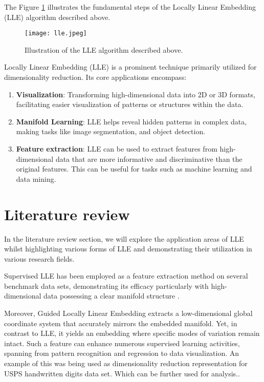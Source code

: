 The Figure \ref{fig:image} illustrates the fundamental steps of the Locally Linear Embedding (LLE) algorithm described above.

\begin{figure}[h]
    \centering
    \texttt{[image: lle.jpeg]}
    \caption{Illustration of the LLE algorithm described above.}
    \label{fig:image}
\end{figure}


Locally Linear Embedding (LLE) is a prominent technique primarily utilized for dimensionality reduction. Its core applications encompass:

\begin{enumerate}
    \item \textbf{Visualization}: Transforming high-dimensional data into 2D or 3D formats, facilitating easier visualization of patterns or structures within the data.
    
    \item \textbf{Manifold Learning}: LLE helps reveal hidden patterns in complex data, making tasks like image segmentation, and object detection.

    \item \textbf{Feature extraction}: LLE can be used to extract features from high-dimensional data that are more informative and discriminative than the original features. This can be useful for tasks such as machine learning and data mining. 

\end{enumerate}


\section{Literature review}



In the literature review section, we will explore the application areas of LLE whilst highlighting various forms of LLE and demonstrating their utilization in various research fields.

Supervised LLE has been employed as a feature extraction method on several benchmark data sets, demonstrating its efficacy particularly with high-dimensional data possessing a clear manifold structure \cite{de2003supervised}.

Moreover, Guided Locally Linear Embedding extracts a low-dimensional global coordinate system that accurately mirrors the embedded manifold. Yet, in contrast to LLE, it yields an embedding where specific modes of variation remain intact. Such a feature can enhance numerous supervised learning activities, spanning from pattern recognition and regression to data visualization. An example of this was being used as dimensionality reduction representation for USPS handwritten digits data set. Which can be further used for analysis.\cite{alipanahi2011guided}.

